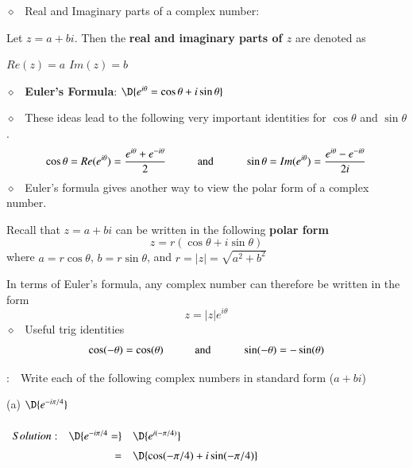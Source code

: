 \documentclass[11pt]{article}
\begin{document}


$\diamond$ \, Real and Imaginary parts of a complex number:

Let $z=a+bi$.  Then the {\bf real and imaginary parts of $z$} are denoted as
\begin{center}
	$Re(z) = a$ \hspace{1.0cm}  \hspace{1.0cm} $Im(z) = b$	
\end{center}

\vspace{0.2cm}
 
$\diamond$ \, {\bf Euler's Formula}: \hspace{0.5cm} $\D{e^{i\theta} = \cos \theta + i \sin \theta}$

\vspace{0.2cm}

$\diamond$ \, These ideas lead to the following very important identities for $\cos \theta$ and $\sin \theta$.
$$
\cos\theta = Re(e^{i\theta}) = \frac{e^{i\theta}+e^{-i\theta}}{2} \hspace{1.0cm} \text{and} \hspace{1.0cm} 
\sin\theta = Im(e^{i\theta}) = \frac{e^{i\theta}-e^{-i\theta}}{2i}
$$
$\diamond$ \, Euler's formula gives another way to view the polar form of a complex number.  

Recall that $z=a+bi$ can be written in the following {\bf polar form}
$$
z=r(\cos \theta + i \sin \theta)	
$$
where $a=r\cos \theta$,  $b = r\sin \theta$, and $r = |z|=\sqrt{a^2+b^2}$

In terms of Euler's formula, any complex number can therefore be written in the form
$$
z = |z|e^{i\theta}
$$
$\diamond$ \, Useful trig identities
$$
\cos(-\theta) = \cos(\theta) \hspace{1.0cm} \text{and} \hspace{1.0cm} \sin(-\theta) = -\sin(\theta)
$$

: \,\, Write each of the following complex numbers in standard form ($a+bi$)

\vspace{0.2cm}

(a) $\D{e^{-i\pi/4}}$

$
\setlength{\extrarowheight}{0.2cm}
\begin{array}{rrl}
	Solution: & \D{e^{-i\pi/4} =} & \D{e^{i(-\pi/4)}} \\
	&=&\D{\cos (-\pi/4) + i \sin (-\pi/4)}\\
\end{array}
$
\end{document}
